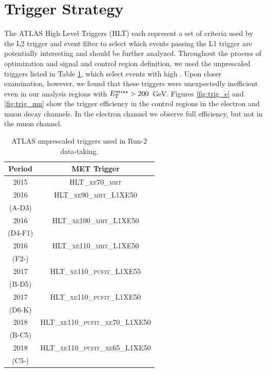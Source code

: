 \section{Trigger Strategy}
\label{section:trig}
\FloatBarrier
The ATLAS High Level Triggers (HLT) each represent a set of criteria used by the L2 trigger and event filter to select which events passing the L1 trigger are potentially interesting and should be further analyzed. Throughout the process of optimization and signal and control region definition, we used the unprescaled \met triggers listed in Table \ref{tab:met_trigs}, which select events with high \met. Upon closer examination, however, we found that these triggers were unexpectedly inefficient even in our analysis regions with $E_{T}^{miss} > 200$~GeV. Figures \ref{fig:trig_e} and \ref{fig:trig_mu} show the \met trigger efficiency in the \ttbar control regions in the electron and muon decay channels. In the electron channel we observe full efficiency, but not in the muon channel.

\begin{table}
\footnotesize{
	\begin{center}
	\begin{tabular}{ c c}
		\toprule
			Period & MET Trigger \\
			\midrule
			2015 & \textsc{HLT\_xe70\_mht} \\
			\midrule
			2016 & \textsc{HLT\_xe90\_mht\_L1XE50} \\
			(A-D3) \\
			\midrule
			2016 & \textsc{HLT\_xe100\_mht\_L1XE50} \\
			(D4-F1) \\
			\midrule
			2016 & \textsc{HLT\_xe110\_mht\_L1XE50} \\
			(F2-) \\
			\midrule
			2017 & \textsc{HLT\_xe110\_pufit\_L1XE55} \\
			(B-D5) \\
			\midrule
			2017 & \textsc{HLT\_xe110\_pufit\_L1XE50} \\
			(D6-K) \\
			\midrule
			2018 & \textsc{HLT\_xe110\_pufit\_xe70\_L1XE50} \\
			(B-C5) \\
			\midrule
			2018 & \textsc{HLT\_xe110\_pufit\_xe65\_L1XE50} \\
			(C5-) \\
		\bottomrule
	\end{tabular}
	\end{center}
	}
  \caption{ATLAS unprescaled \met triggers used in Run-2 data-taking.}
  \label{tab:met_trigs}
\end{table}

